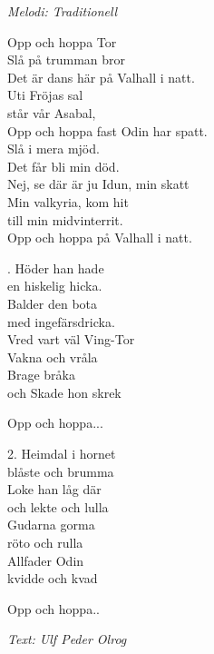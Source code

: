 {\footnotesize\textit{Melodi: Traditionell}}\par
\vspace{10pt}
Opp och hoppa Tor\\
Slå på trumman bror\\
Det är dans här på Valhall i natt.\\
Uti Fröjas sal\\
står vår Asabal,\\
Opp och hoppa fast Odin har spatt.\\
Slå i mera mjöd.\\
Det får bli min död.\\
Nej, se där är ju Idun, min skatt\\
Min valkyria, kom hit\\
till min midvinterrit.\\
Opp och hoppa på Valhall i natt.\par
{}. Höder han hade\\
en hiskelig hicka.\\
Balder den bota\\
med ingefärsdricka.\\
Vred vart väl Ving-Tor\\
Vakna och vråla\\
Brage bråka\\
och Skade hon skrek\par
\vspace{10pt}
Opp och hoppa...\par
\vspace{10pt}
2. Heimdal i hornet\\
blåste och brumma\\
Loke han låg där\\
och lekte och lulla\\
Gudarna gorma\\
röto och rulla\\
Allfader Odin\\
kvidde och kvad\par
\vspace{10pt}
Opp och hoppa..
\par
\vspace{10pt}
{\footnotesize\textit{Text: Ulf Peder Olrog}}
